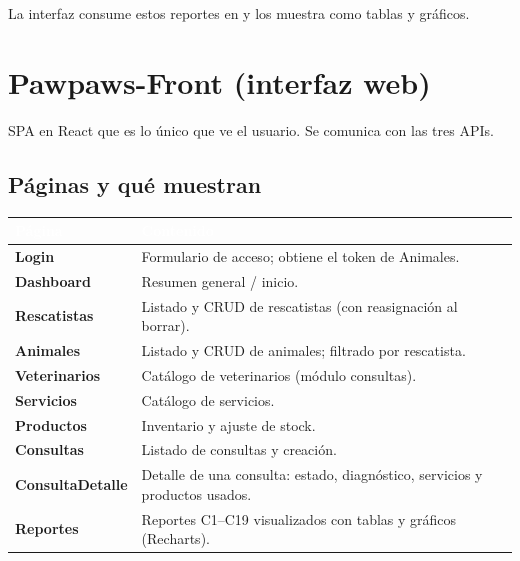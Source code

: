 \documentclass[11pt,a4paper]{article}
\begin{document}
\noindent
La interfaz consume estos reportes en  y los muestra como
tablas y gráficos.

\section{Pawpaws-Front (interfaz web)}

SPA en React que es lo único que ve el usuario. Se comunica con las tres APIs.

\subsection{Páginas y qué muestran}
\begin{center}
\begin{tabular}{>{\bfseries}p{3.0cm} p{10.7cm}}
\toprule
\rowcolor{moss}\textcolor{white}{\textbf{Página}} & \textcolor{white}{\textbf{Contenido}} \\
\midrule
Login        & Formulario de acceso; obtiene el token de Animales. \\
Dashboard    & Resumen general / inicio. \\
Rescatistas  & Listado y CRUD de rescatistas (con reasignación al borrar). \\
Animales     & Listado y CRUD de animales; filtrado por rescatista. \\
Veterinarios & Catálogo de veterinarios (módulo consultas). \\
Servicios    & Catálogo de servicios. \\
Productos    & Inventario y ajuste de stock. \\
Consultas    & Listado de consultas y creación. \\
ConsultaDetalle & Detalle de una consulta: estado, diagnóstico, servicios y productos usados. \\
Reportes     & Reportes C1--C19 visualizados con tablas y gráficos (Recharts). \\
\bottomrule
\end{tabular}
\end{center}
\end{document}

